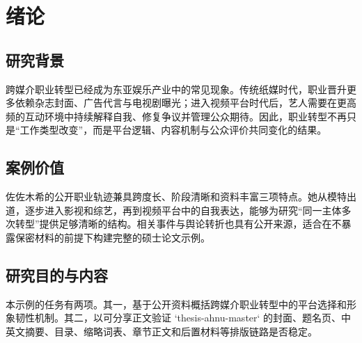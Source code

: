 \chapter{绪论}

\section{研究背景}

跨媒介职业转型已经成为东亚娱乐产业中的常见现象。传统纸媒时代，职业晋升更多依赖杂志封面、广告代言与电视剧曝光；进入视频平台时代后，艺人需要在更高频的互动环境中持续解释自我、修复争议并管理公众期待。因此，职业转型不再只是“工作类型改变”，而是平台逻辑、内容机制与公众评价共同变化的结果。

\section{案例价值}

佐佐木希的公开职业轨迹兼具跨度长、阶段清晰和资料丰富三项特点。她从模特出道，逐步进入影视和综艺，再到视频平台中的自我表达，能够为研究“同一主体多次转型”提供足够清晰的结构。相关事件与舆论转折也具有公开来源，适合在不暴露保密材料的前提下构建完整的硕士论文示例。

\section{研究目的与内容}

本示例的任务有两项。其一，基于公开资料概括跨媒介职业转型中的平台选择和形象韧性机制。其二，以可分享正文验证 `thesis-ahnu-master` 的封面、题名页、中英文摘要、目录、缩略词表、章节正文和后置材料等排版链路是否稳定。
